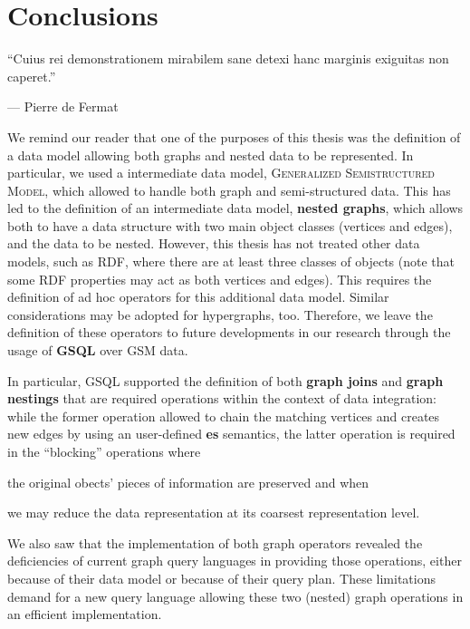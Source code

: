 \chapter{Conclusions}\label{cha:IteMissaEst}
\epigraph{``Cuius rei demonstrationem mirabilem sane detexi hanc marginis exiguitas non caperet.''}{--- Pierre de Fermat}

We remind our reader that one of  the purposes of this thesis was the definition of a data model allowing both graphs and nested data to be represented. In particular, we used a intermediate data model, \textsc{Generalized Semistructured Model}, which allowed to handle both graph and semi-structured data. This has led to the definition of an intermediate data model, \textbf{nested graphs}, which allows both to have a data structure with two main object classes (vertices and edges), and the data to be nested. However, this thesis has not treated other data models, such as RDF, where there are at least three classes of objects (note that some RDF properties may act as both vertices and edges). This requires the definition of ad hoc operators for this additional data model. Similar considerations may be adopted for hypergraphs, too. Therefore, we leave the definition of these operators  to future developments in our research through the usage of \textbf{GSQL} over GSM data. %

In particular, GSQL supported the definition of both \textbf{graph joins} and \textbf{graph nestings} that are required operations within the context of data integration: while the former operation allowed to chain the matching vertices and creates new edges by using an user-defined \textbf{es} semantics, the latter operation is required in the ``blocking'' operations where \begin{mylist}
	\item the original obects' pieces of information are preserved and when
	\item we may reduce the data representation at its coarsest representation level.
\end{mylist}
We also saw that the implementation of both graph operators revealed the deficiencies of current graph query languages in providing those operations, either because of their data model or because of their query plan. These limitations demand for a new query language allowing these two (nested) graph operations in an efficient implementation. 

